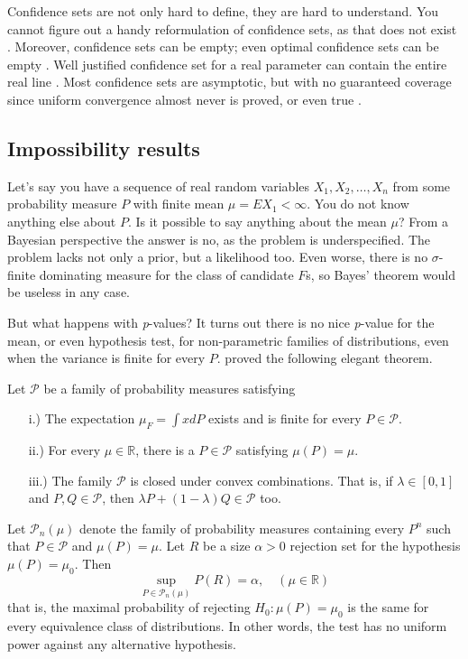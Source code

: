 Confidence sets are not only hard to define, they are hard to understand. You cannot figure out a handy reformulation of confidence sets, as that does not exist \parencite{Morey2016-ry}. Moreover, confidence sets can be empty; even optimal confidence sets can be empty \parencite[Section 3.1]{Blaker2000-ud}. Well justified confidence set for a real parameter can contain the entire real line \parencite[Section 3.2--3.3]{Blaker2000-ud}. Most confidence sets are asymptotic, but with no guaranteed coverage since uniform convergence almost never is proved, or even true \parencite{Gleser1996-kk}.

\subsection{Impossibility results}

Let's say you have a sequence of real random variables $X_{1},X_{2},\ldots,X_{n}$ from some probability measure $P$ with finite mean $\mu=EX_{1}<\infty$. You do not know anything else about $P$. Is it possible to say anything about the mean $\mu$? From a Bayesian perspective the answer is no, as the problem is underspecified. The problem lacks not only a prior, but a likelihood too. Even worse, there is no $\sigma$-finite dominating measure for the class of candidate $F$s, so Bayes' theorem would be useless in any case. 

But what happens with \emph{p}-values? It turns out there is no nice \emph{p}-value for the mean, or even hypothesis test, for non-parametric families of distributions, even when the variance is finite for every $P$. \textcite{Bahadur1956-tg} proved the following elegant theorem.
\begin{theorem}
Let $\mathcal{\mathcal{P}}$ be a family of probability measures
satisfying
\begin{enumerate}
\item[i.)] The expectation $\mu_{F}=\int xdP$ exists and is finite for every
$P\in\mathcal{P}$.
\item[ii.)] For every $\mu\in\mathbb{R}$, there is a $P\in\mathcal{\mathcal{P}}$
satisfying $\mu(P)=\mu$.
\item[iii.)] The family $\mathcal{\mathcal{P}}$ is closed under convex combinations.
That is, if $\lambda\in[0,1]$ and $P,Q\in\mathcal{P}$, then $\lambda P+(1-\lambda)Q\in\mathcal{P}$
too.
\end{enumerate}
Let $\mathcal{P}_{n}(\mu)$ denote the family of probability measures
containing every $P^{n}$ such that $P\in\mathcal{P}$ and $\mu(P)=\mu$.
Let $R$ be a size $\alpha>0$ rejection set for the hypothesis $\mu(P)=\mu_{0}$.
Then 
\[
\sup_{P\in\mathcal{P}_{n}(\mu)}P(R)=\alpha,\quad(\mu\in\mathbb{R})
\]
that is, the maximal probability of rejecting $H_{0}:\mu(P)=\mu_{0}$
is the same for every equivalence class of distributions. In other words,
the test has no uniform power against any alternative hypothesis. 
\end{theorem}

